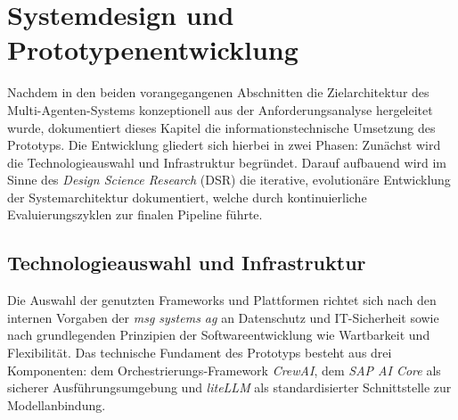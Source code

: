 \chapter{Systemdesign und Prototypenentwicklung}
\label{ch:architektur}

Nachdem in den beiden vorangegangenen Abschnitten die Zielarchitektur des Multi-Agenten-Systems konzeptionell aus der Anforderungsanalyse hergeleitet wurde, dokumentiert dieses Kapitel die informationstechnische Umsetzung des Prototyps. Die Entwicklung gliedert sich hierbei in zwei Phasen: Zunächst wird die Technologieauswahl und Infrastruktur begründet. Darauf aufbauend wird im Sinne des \textit{Design Science Research} (\ac{DSR}) die iterative, evolutionäre Entwicklung der Systemarchitektur dokumentiert, welche durch kontinuierliche Evaluierungszyklen zur finalen Pipeline führte.

\section{Technologieauswahl und Infrastruktur}
\label{sec:technologieauswahl_und_infrastruktur}

Die Auswahl der genutzten Frameworks und Plattformen richtet sich nach den internen Vorgaben der \textit{msg systems ag} an Datenschutz und IT-Sicherheit sowie nach grundlegenden Prinzipien der Softwareentwicklung wie Wartbarkeit und Flexibilität. Das technische Fundament des Prototyps besteht aus drei Komponenten: dem Orchestrierungs-Framework \textit{CrewAI}, dem \textit{SAP AI Core} als sicherer Ausführungsumgebung und \textit{liteLLM} als standardisierter Schnittstelle zur Modellanbindung.
